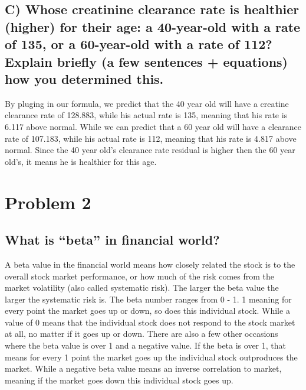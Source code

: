 \documentclass[
]{article}
\begin{document}
\hypertarget{c-whose-creatinine-clearance-rate-is-healthier-higher-for-their-age-a-40-year-old-with-a-rate-of-135-or-a-60-year-old-with-a-rate-of-112-explain-briefly-a-few-sentences-equations-how-you-determined-this.}{%
\subsection{C) Whose creatinine clearance rate is healthier (higher) for
their age: a 40-year-old with a rate of 135, or a 60-year-old with a
rate of 112? Explain briefly (a few sentences + equations) how you
determined
this.}\label{c-whose-creatinine-clearance-rate-is-healthier-higher-for-their-age-a-40-year-old-with-a-rate-of-135-or-a-60-year-old-with-a-rate-of-112-explain-briefly-a-few-sentences-equations-how-you-determined-this.}}

By pluging in our formula, we predict that the 40 year old will have a
creatine clearance rate of 128.883, while his actual rate is 135,
meaning that his rate is 6.117 above normal. While we can predict that a
60 year old will have a clearance rate of 107.183, while his actual rate
is 112, meaning that his rate is 4.817 above normal. Since the 40 year
old's clearance rate residual is higher then the 60 year old's, it means
he is healthier for this age.

\hypertarget{problem-2}{%
\section{Problem 2}\label{problem-2}}

\hypertarget{what-is-beta-in-financial-world}{%
\subsection{What is ``beta'' in financial
world?}\label{what-is-beta-in-financial-world}}

A beta value in the financial world means how closely related the stock
is to the overall stock market performance, or how much of the risk
comes from the market volatility (also called systematic risk). The
larger the beta value the larger the systematic risk is. The beta number
ranges from 0 - 1. 1 meaning for every point the market goes up or down,
so does this individual stock. While a value of 0 means that the
individual stock does not respond to the stock market at all, no matter
if it goes up or down. There are also a few other occasions where the
beta value is over 1 and a negative value. If the beta is over 1, that
means for every 1 point the market goes up the individual stock
outproduces the market. While a negative beta value means an inverse
correlation to market, meaning if the market goes down this individual
stock goes up.
\end{document}
